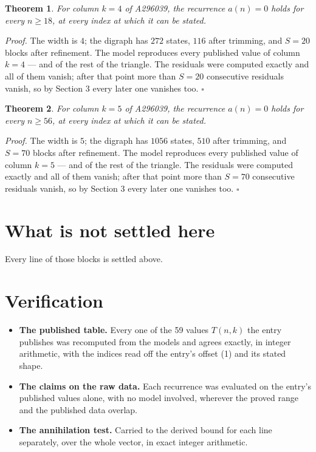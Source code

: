 \documentclass[11pt]{article}
\newtheorem{theorem}{Theorem}
\theoremstyle{definition}
\begin{document}
\begin{theorem} For column $k = 4$ of A296039, the recurrence $a(n) = 0$ holds for every $n \ge 18$, at every index at which it can be stated.\end{theorem}

{\itshape Proof.} The width is $4$; the digraph has $272$ states, $116$ after trimming, and $S = 20$ blocks after refinement. The model reproduces every published value of column $k = 4$ --- and of the rest of the triangle. The residuals were computed exactly and all of them vanish; after that point more than $S = 20$ consecutive residuals vanish, so by Section 3 every later one vanishes too. $\square$

\begin{theorem} For column $k = 5$ of A296039, the recurrence $a(n) = 0$ holds for every $n \ge 56$, at every index at which it can be stated.\end{theorem}

{\itshape Proof.} The width is $5$; the digraph has $1056$ states, $510$ after trimming, and $S = 70$ blocks after refinement. The model reproduces every published value of column $k = 5$ --- and of the rest of the triangle. The residuals were computed exactly and all of them vanish; after that point more than $S = 70$ consecutive residuals vanish, so by Section 3 every later one vanishes too. $\square$

\section{What is not settled here}

Every line of those blocks is settled above.

\section{Verification}

\begin{itemize}

\item {\bfseries The published table.} Every one of the 59 values $T(n,k)$ the entry publishes was recomputed from the models and agrees exactly, in integer arithmetic, with the indices read off the entry's offset (1) and its stated shape.

\item {\bfseries The claims on the raw data.} Each recurrence was evaluated on the entry's published values alone, with no model involved, wherever the proved range and the published data overlap.

\item {\bfseries The annihilation test.} Carried to the derived bound for each line separately, over the whole vector, in exact integer arithmetic.

\end{itemize}
\end{document}
